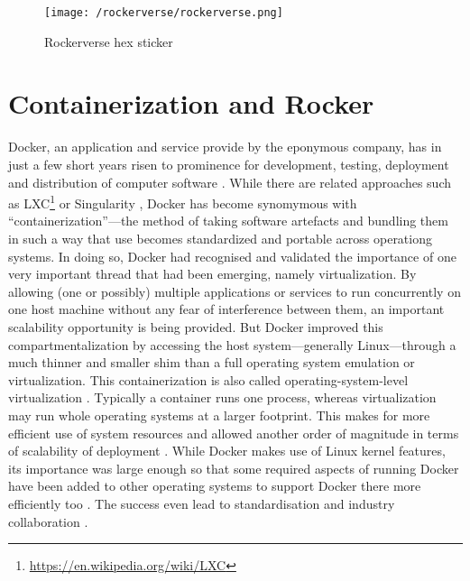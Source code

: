 \begin{figure}
\centering
\texttt{[image: /rockerverse/rockerverse.png]}
\caption{Rockerverse hex sticker}
\end{figure}

\hypertarget{containerization-and-rocker}{%
\section{Containerization and
Rocker}\label{containerization-and-rocker}}

\label{containerisation} \label{rocker}

Docker, an application and service provide by the eponymous company, has
in just a few short years risen to prominence for development, testing,
deployment and distribution of computer software
\citep[cf.][]{datadog_8_2018,munoz_history_2019}. While there are
related approaches such as
LXC\footnote{\href{https://en.wikipedia.org/wiki/LXC}{https://en.wikipedia.org/wiki/LXC}}
or Singularity \citep{kurtzer_singularity_2017}, Docker has become
synomymous with ``containerization''---the method of taking software
artefacts and bundling them in such a way that use becomes standardized
and portable across operationg systems. In doing so, Docker had
recognised and validated the importance of one very important thread
that had been emerging, namely virtualization. By allowing (one or
possibly) multiple applications or services to run concurrently on one
host machine without any fear of interference between them, an important
scalability opportunity is being provided. But Docker improved this
compartmentalization by accessing the host system---generally
Linux---through a much thinner and smaller shim than a full operating
system emulation or virtualization. This containerization is also called
operating-system-level virtualization
\citep{wikipedia_contributors_os-level_2020}. Typically a container runs
one process, whereas virtualization may run whole operating systems at a
larger footprint. This makes for more efficient use of system resources
\citep{felter_updated_2015} and allowed another order of magnitude in
terms of scalability of deployment \citep[cf.][]{datadog_8_2018}. While
Docker makes use of Linux kernel features, its importance was large
enough so that some required aspects of running Docker have been added
to other operating systems to support Docker there more efficiently too
\citep{microsoft_linux_2019}. The success even lead to standardisation
and industry collaboration \citep{oci_open_2019}.

